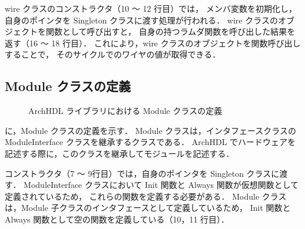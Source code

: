 wire クラスのコンストラクタ（10 ～ 12 行目）では，
メンバ変数を初期化し，自身のポインタを Singleton クラスに渡す処理が行われる．
wire クラスのオブジェクトを関数として呼び出すと，
自身の持つラムダ関数を呼び出した結果を返す（16 ～ 18 行目）．
これにより，wire クラスのオブジェクトを関数呼び出しすることで，
そのサイクルでのワイヤの値が取得できる．

\subsection{Module クラスの定義}

\begin{figure}[t]
 
 \caption{ArchHDL ライブラリにおける Module クラスの定義}
 \label{src:module}
\end{figure}

 に，Module クラスの定義を示す．
Module クラスは，インタフェースクラスの ModuleInterface クラスを継承するクラスである．
ArchHDL でハードウェアを記述する際に，このクラスを継承してモジュールを記述する．

コンストラクタ（7 ～ 9行目）では，自身のポインタを Singleton クラスに渡す．
ModuleInterface クラスにおいて Init 関数と Always 関数が仮想関数として定義されているため，
これらの関数を定義する必要がある．
Module クラスは，Module 子クラスのインタフェースとして定義しているため，
Init 関数と Always 関数として空の関数を定義している（10，11 行目）．
